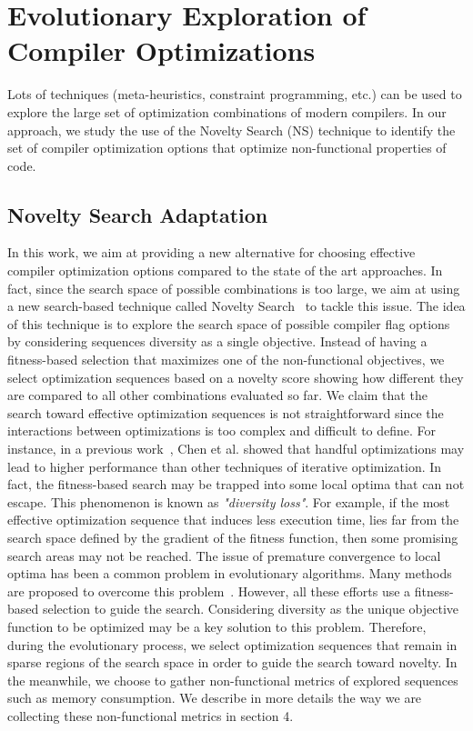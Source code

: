 \section{Evolutionary Exploration of Compiler Optimizations }


Lots of techniques (meta-heuristics, constraint programming, etc.) can be used to explore the large set of optimization combinations of modern compilers. 
In our approach, we study the use of the Novelty Search (NS) technique to identify the set of compiler optimization options that optimize non-functional properties of code.

\subsection{Novelty Search Adaptation}

In this work, we aim at providing a new alternative for choosing effective compiler optimization options compared to the state of the art approaches. 
In fact, since the search space of possible combinations is too large, we aim at using a new search-based technique called Novelty Search~\cite{lehman2008exploiting} to tackle this issue. 
The idea of this technique is to explore the search space of possible compiler flag options by considering sequences diversity as a single objective. 
Instead of having a fitness-based selection that maximizes one of the non-functional objectives, we select optimization sequences based on a novelty score showing how different they are compared to all other combinations evaluated so far. 
We claim that the search toward effective optimization sequences is not straightforward since the interactions between optimizations is too complex and difficult to define. 
For instance, in a previous work~\cite{chen2012deconstructing}, Chen et al. showed that handful optimizations may lead to higher performance than other techniques of iterative optimization. 
In fact, the fitness-based search may be trapped into some local optima that can not escape. 
This phenomenon is known as \textit{"diversity loss"}. For example, if the most effective optimization sequence that induces less execution time, lies far from the search space defined by the gradient of the fitness function, then some promising search areas may not be reached. 
The issue of premature convergence to local optima has been a common problem in evolutionary algorithms. 
Many methods are proposed to overcome this problem~\cite{banzhaf1996effect}. 
However, all these efforts use a fitness-based selection to guide the search. Considering diversity as the unique objective function to be optimized may be a key solution to this problem.
Therefore, during the evolutionary process, we select optimization sequences that remain in sparse regions of the search space in order to guide the search toward novelty. 
In the meanwhile, we choose to gather non-functional metrics of explored sequences such as memory consumption. 
We describe in more details the way we are collecting these non-functional metrics in section 4.

